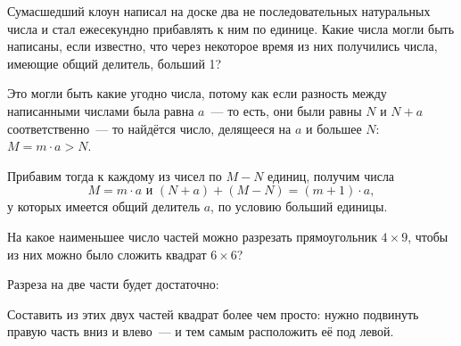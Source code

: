 

\begin{itemize}
	\itB {}
	
	\itC Сумасшедший клоун написал на доске два не последовательных натуральных числа и стал ежесекундно прибавлять к ним по единице. Какие числа могли быть написаны, если известно, что через некоторое время из них получились числа, имеющие общий делитель, больший 1?
	
	\itr Это могли быть какие угодно числа, потому как если разность между написанными числами была равна $a$~— то есть, они были равны $N$ и $N+a$ соответственно~— то найдётся число, делящееся на $a$ и большее $N$: $M= m \cdot a > N$.
	
	Прибавим тогда к каждому из чисел по $M - N$ единиц, получим числа
	$$M = m \cdot a\text{\ \ и\ \ }(N+a) + (M-N) = (m+1) \cdot a,$$
	у которых имеется общий делитель $a$, по условию больший единицы.
\end{itemize}


\begin{itemize}

	\itB На какое наименьшее число частей можно разрезать прямоугольник $4\times 9$, чтобы из них можно было сложить квадрат $6\times 6$? 

	\itr Разреза на две части будет достаточно:
	
	\begin{center}  \end{center}
	
	Составить из этих двух частей квадрат более чем просто: нужно подвинуть правую часть вниз и влево~— и тем самым расположить её под левой.

\end{itemize}


